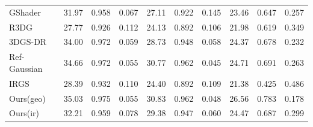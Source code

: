 \begin{table}[h!]
{\begin{tabular}{l|ccc|ccc|ccc}
GShader\cite{jiang2024gaussianshader}           & 31.97                         & 0.958                         & 0.067                         & 27.11                         & 0.922                         & 0.145                         & 23.46                         & 0.647                         & 0.257                         \\
R3DG\cite{gao2024r3dg}              & 27.77                         & 0.926                         & 0.112                         & 24.13                         & 0.892                         & 0.106                         & 21.98                         & 0.619                         & 0.349                         \\
3DGS-DR\cite{ye20243dgsdr}      & 34.00                         & 0.972                         & 0.059                         & 28.73                         & 0.948                         & 0.058                         & 24.37                         & 0.678                         & \cellcolor[HTML]{FFCCC9}0.232 \\
Ref-Gaussian\cite{yao2024refgaussian}            & \cellcolor[HTML]{FFCCC9}34.66 & 0.972                         & 0.055                         & \cellcolor[HTML]{FFCCC9}30.77 & \cellcolor[HTML]{FFCCC9}0.962 & \cellcolor[HTML]{FD6864}0.045 & \cellcolor[HTML]{FFCCC9}24.71 & \cellcolor[HTML]{FFCCC9}0.691 & 0.263                         \\
IRGS\cite{gu2025irgs}              & 28.39                         & 0.932                         & 0.110                         & 24.40                         & 0.892                         & 0.109                         & 21.38                         & 0.425                         & 0.486                         \\
Ours(geo)          & \cellcolor[HTML]{FD6864}35.03 & \cellcolor[HTML]{FFCCC9}0.975 & \cellcolor[HTML]{FFCCC9}0.055 & \cellcolor[HTML]{FD6864}30.83 & \cellcolor[HTML]{FD6864}0.962 & \cellcolor[HTML]{FFCCC9}0.048 & \cellcolor[HTML]{FD6864}26.56 & \cellcolor[HTML]{FD6864}0.783 & \cellcolor[HTML]{FD6864}0.178 \\
Ours(ir)          & 32.21                         & 0.959                         & 0.078                         & 29.38                         & 0.947                         & 0.060                         & 24.47                         & 0.687                         & 0.299                         \\ \hline
\hline
\end{tabular}%
}
\end{table}

